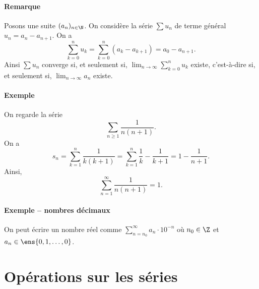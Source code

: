 \documentclass{livre}
\begin{document}
\paragraph{Remarque}Posons une suite $(a_n)_{n\in \N}$. On considère la série $\sum u_n$ de terme général $u_n = a_n - a_{n+1}$. On a \[ \sum_{k=0}^{n} u_k = \sum_{k=0}^{n}(a_k - a_{k+1}) = a_0 - a_{n+1}. \]Ainsi $\sum u_n$ converge si, et seulement si, $\lim_{n\to \infty} \sum_{k=0}^{n}u_k$ existe, c'est-à-dire si, et seulement si, $\lim_{n\to \infty} a_n$ existe.

\paragraph{Exemple}On regarde la série \[\sum_{n\geq 1}\frac{1}{n(n+1)}.\]On a \[ s_n = \sum_{k=1}^{n} \frac{1}{k(k+1)} = \sum_{k=1}^{n}\frac{1}{k}-\frac{1}{k+1} = 1 - \frac{1}{n+1}.\]Ainsi, \[ \sum_{n=1}^{\infty}\frac{1}{n(n+1)} = 1.\]

\paragraph{Exemple -- nombres décimaux}On peut écrire un nombre réel comme $\sum_{n=n_0}^{\infty}a_n\cdot 10^{-n}$ où $n_0\in \Z$ et $a_n \in \ens{0,1,\ldots,0}$.

\section{Opérations sur les séries}
\end{document}
